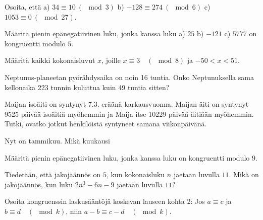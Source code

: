 \begin{kotitehtavasivu}

\begin{tehtava}
	Osoita, että a) $34 \equiv 10\ (\mod 3)$ b) $-128 \equiv 274\ (\mod 6)$ c) $1053 \equiv 0\ (\mod 27)$.
\end{tehtava}

\begin{tehtava}
	Määritä pienin epänegatiivinen luku, jonka kanssa luku a) $25$ b) $-121$ c) $5777$ on kongruentti modulo $5$.
\end{tehtava}

\begin{tehtava}
	Määritä kaikki kokonaisluvut $x$, joille $x \equiv 3\quad (\mod 8)$ ja $-50 < x < 51$.
\end{tehtava}

\begin{tehtava}
	Neptunus-planeetan pyörähdysaika on noin 16 tuntia. Onko Neptunuksella sama kellonaika 223 tunnin kuluttua kuin 49 tuntia sitten?
\end{tehtava}

\begin{tehtava}
	Maijan isoäiti on syntynyt 7.3. eräänä karkausvuonna. Maijan äiti on syntynyt 9525 päivää isoäitiä myöhemmin ja Maija itse 10229 päivää äitiään myöhemmin. Tutki, ovatko jotkut henkilöistä syntyneet samana viikonpäivänä.
\end{tehtava}

\begin{tehtava}
	Nyt on tammikuu. Mikä kuukausi
\end{tehtava}

\begin{tehtava}
	Määritä pienin epänegatiivinen luku, jonka kanssa luku
	on kongruentti modulo 9.
\end{tehtava}

\begin{tehtava}
	Tiedetään, että jakojäännös on $5$, kun kokonaisluku $n$ jaetaan luvulla $11$. Mikä on jakojäännös, kun luku $2n^3 - 6n - 9$ jaetaan luvulla $11$?
\end{tehtava}

\begin{tehtava}
	Osoita kongruenssin laskusääntöjä koskevan lauseen kohta 2: Jos $a\equiv c$ ja $b\equiv d\quad (\mod k)$, niin $a-b\equiv c-d \quad(\mod k)$.
\end{tehtava}


\end{kotitehtavasivu}

